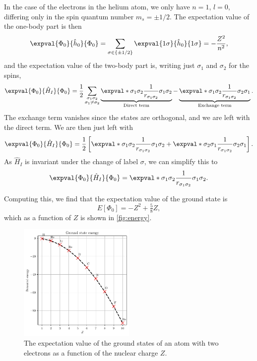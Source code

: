 In the case of the electrons in the helium atom, we only have $n = 1$, $l = 0$, differing only in the spin quantum number $m_s = \pm 1/2$.
The expectation value of the one-body part is then
\begin{equation*}
    \expval{\Phi_0}{\hat{h}_0}{\Phi_0} = \sum_{\sigma \in \{\pm 1/2\}} \expval{1\sigma}{\hat{h}_0}{1\sigma} = -\frac{Z^2}{n^2},
\end{equation*}
and the expectation value of the two-body part is, writing just $\sigma_1$ and $\sigma_2$ for the spins,
\begin{equation*}
    \expval{\Phi_0}{\hat{H}_I}{\Phi_0}
    = \frac{1}{2} \sum_{\substack{\sigma_1\sigma_2\\ \sigma_1 \neq \sigma_2}}
    \underbrace{\expval*{\sigma_1 \sigma_2}{\frac{1}{r_{\sigma_1\sigma_2}}}{\sigma_1 \sigma_2}}_{\textnormal{Direct term}}
    - \underbrace{\expval*{\sigma_1 \sigma_2}{\frac{1}{r_{\sigma_1\sigma_2}}}{\sigma_2\sigma_1}}_{\textnormal{Exchange term}}.
\end{equation*}
The exchange term vanishes since the states are orthogonal, and we are left with the direct term.
We are then just left with
\begin{equation*}
    \expval{\Phi_0}{\hat{H}_I}{\Phi_0} = \frac{1}{2}\left[ \expval*{\sigma_1 \sigma_2}{\frac{1}{r_{\sigma_1 \sigma_2}}}{\sigma_1 \sigma_2} + \expval*{\sigma_2 \sigma_1}{\frac{1}{r_{\sigma_1 \sigma_2}}}{\sigma_2 \sigma_1}\right].
\end{equation*}
As $\hat{H}_I$ is invariant under the change of label $\sigma$, we can simplify this to
\begin{equation*}
    \expval{\Phi_0}{\hat{H}_I}{\Phi_0} = \expval*{\sigma_1 \sigma_2}{\frac{1}{r_{\sigma_1 \sigma_2}}}{\sigma_1 \sigma_2}.
\end{equation*}

Computing this, we find that the expectation value of the ground state is
\begin{equation}
    E[\Phi_0] = -Z^2 + \tfrac{5}{8}Z,
\end{equation}
which as a function of $Z$ is shown in \autoref{fig:energy}.

\begin{figure}[ht]
    \centering
    \includegraphics[width=0.5\textwidth]{figs/energy_plot.pdf}
    \caption{The expectation value of the ground states of an atom with two electrons as a function of the nuclear charge $Z$.\label{fig:energy}}
\end{figure}
